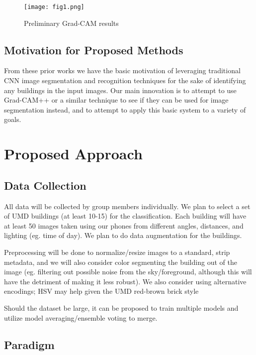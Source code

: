 \documentclass{article}
\begin{document}
\begin{figure}
    \centering
    \texttt{[image: fig1.png]}
    \caption{Preliminary Grad-CAM results}
    \label{fig:prelim_results_1}
\end{figure}

\subsection{Motivation for Proposed Methods}

From these prior works we have the basic motivation of leveraging traditional CNN image segmentation and recognition techniques for the sake of identifying any buildings in the input images. Our main innovation is to attempt to use Grad-CAM++ or a similar technique to see if they can be used for image segmentation instead, and to attempt to apply this basic system to a variety of goals.

\section{Proposed Approach}
\label{approach}

\subsection{Data Collection}

All data will be collected by group members individually. We plan to select a set of UMD buildings (at least 10-15) for the classification. Each building will have at least 50 images taken using our phones from different angles, distances, and lighting (eg. time of day). We plan to do data augmentation for the buildings. 

Preprocessing will be done to normalize/resize images to a standard, strip metadata, and we will also consider color segmenting the building out of the image (eg. filtering out possible noise from the sky/foreground, although this will have the detriment of making it less robust). We also consider using alternative encodings; HSV may help given the UMD red-brown brick style

Should the dataset be large, it can be proposed to train multiple models and utilize model averaging/ensemble voting to merge.

\subsection{Paradigm}
\end{document}
